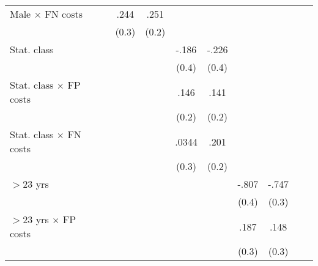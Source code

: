 \begin{table}[htbp]
\begin{tabular}{l*{9}{c}}
Male $\times$ FN costs&                  &     .244         &     .251         &                  &                  &                  &                  &                  &                  \\
                &                  &    (0.3)         &    (0.2)         &                  &                  &                  &                  &                  &                  \\
Stat. class     &                  &                  &                  &    -.186         &    -.226         &                  &                  &                  &                  \\
                &                  &                  &                  &    (0.4)         &    (0.4)         &                  &                  &                  &                  \\
Stat. class $\times$ FP costs&                  &                  &                  &     .146         &     .141         &                  &                  &                  &                  \\
                &                  &                  &                  &    (0.2)         &    (0.2)         &                  &                  &                  &                  \\
Stat. class $\times$ FN costs&                  &                  &                  &    .0344         &     .201         &                  &                  &                  &                  \\
                &                  &                  &                  &    (0.3)         &    (0.2)         &                  &                  &                  &                  \\
$>$23 yrs       &                  &                  &                  &                  &                  &    -.807\sym{**} &    -.747\sym{**} &                  &                  \\
                &                  &                  &                  &                  &                  &    (0.4)         &    (0.3)         &                  &                  \\
$>$23 yrs $\times$ FP costs&                  &                  &                  &                  &                  &     .187         &     .148         &                  &                  \\
                &                  &                  &                  &                  &                  &    (0.3)         &    (0.3)         &                  &                  \\

\end{tabular}
\end{table}
